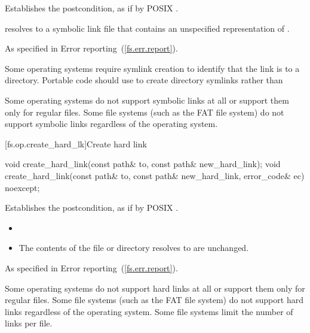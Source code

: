 \begin{itemdescr}
\pnum
\effects Establishes the postcondition, as if by POSIX .

\pnum
\postcondition {} resolves to a symbolic link file that
  contains an unspecified representation of .

\pnum
\throws As specified in Error reporting~(\ref{fs.err.report}).

\pnum
\begin{note} Some operating systems require symlink creation to
  identify that the link is to a directory. Portable code should use  to create directory symlinks rather than  \end{note}

\pnum
\begin{note} Some operating systems do not support symbolic links at all or support
  them only for regular files.
  Some file systems (such as the FAT file system) do not
  support
  symbolic links regardless of the operating system. \end{note}
\end{itemdescr}

[fs.op.create_hard_lk]{Create hard link}

\begin{itemdecl}
void create_hard_link(const path& to, const path& new_hard_link);
void create_hard_link(const path& to, const path& new_hard_link,
                                      error_code& ec) noexcept;
\end{itemdecl}

\begin{itemdescr}
\pnum
\effects Establishes the postcondition, as if by POSIX .

\pnum
\postcondition
\begin{itemize}
\item {}
\item The contents of the file or directory
     resolves to are unchanged.
\end{itemize}

\pnum
\throws As specified in Error reporting~(\ref{fs.err.report}).

\pnum
\begin{note} Some operating systems do not support hard links at all or support
  them only for regular files. Some file systems (such as the FAT file system)
  do not support hard links regardless of the operating system.
  Some file systems limit the number of links per file. \end{note}
\end{itemdescr}

